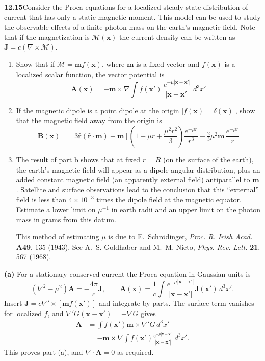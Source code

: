 \par\bigskip
\noindent\textbf{12.15}\quad Consider the Proca equations for a localized steady-state distribution of current that has only a static magnetic moment. This model can be used to study the observable effects of a finite photon mass on the earth's magnetic field. Note that if the magnetization is $\mathcal{M}(\mathbf{x})$ the current density can be written as $\mathbf{J}=c(\nabla\times\mathcal{M})$.
\begin{enumerate}
\item[(a)] Show that if $\mathcal{M}=\mathbf{m}f(\mathbf{x})$, where $\mathbf{m}$ is a fixed vector and $f(\mathbf{x})$ is a localized scalar function, the vector potential is
\[
\mathbf{A}(\mathbf{x})=-\mathbf{m}\times\nabla\int f(\mathbf{x}')\,\frac{e^{-\mu|\mathbf{x}-\mathbf{x}'|}}{|\mathbf{x}-\mathbf{x}'|}\;d^{3}x'
\]
\item[(b)] If the magnetic dipole is a point dipole at the origin [$f(\mathbf{x})=\delta(\mathbf{x})$], show that the magnetic field away from the origin is
\[
\mathbf{B}(\mathbf{x})=[3\hat{\mathbf{r}}(\hat{\mathbf{r}}\cdot\mathbf{m})-\mathbf{m}]\!\left(1+\mu r+\frac{\mu^{2}r^{2}}{3}\right)\!\frac{e^{-\mu r}}{r^{3}}-\tfrac{2}{3}\mu^{2}\mathbf{m}\,\frac{e^{-\mu r}}{r}
\]
\item[(c)] The result of part b shows that at fixed $r=R$ (on the surface of the earth), the earth's magnetic field will appear as a dipole angular distribution, plus an added constant magnetic field (an apparently external field) antiparallel to $\mathbf{m}$. Satellite and surface observations lead to the conclusion that this ``external'' field is less than $4\times10^{-3}$ times the dipole field at the magnetic equator. Estimate a lower limit on $\mu^{-1}$ in earth radii and an upper limit on the photon mass in grams from this datum.

This method of estimating $\mu$ is due to E.~Schr\"odinger, \emph{Proc. R. Irish Acad.} \textbf{A49}, 135 (1943). See A.~S. Goldhaber and M.~M. Nieto, \emph{Phys. Rev. Lett.} \textbf{21}, 567 (1968).
\end{enumerate}
\solution

\medskip\noindent\textbf{(a)} For a stationary conserved current the Proca equation in Gaussian
units is
\[
(\nabla^2-\mu^2)\mathbf A=-\frac{4\pi}{c}\mathbf J,\qquad
\mathbf A(\mathbf x)=\frac1c\int
 \frac{e^{-\mu|\mathbf x-\mathbf x'|}}{|\mathbf x-\mathbf x'|}
 \mathbf J(\mathbf x')\,d^3x'.
\]
Insert $\mathbf J=c\nabla'\times[\mathbf m f(\mathbf x')]$
and integrate by parts.  The surface term vanishes for localized
$f$, and $\nabla'G(\mathbf x-\mathbf x')=-\nabla G$ gives
\begin{align*}
\mathbf A
 &=\int f(\mathbf x')\mathbf m\times\nabla'G\,d^3x'\\
 &=-\mathbf m\times\nabla
 \int f(\mathbf x')\frac{e^{-\mu|\mathbf x-\mathbf x'|}}
 {|\mathbf x-\mathbf x'|}\,d^3x'.
\end{align*}
This proves part (a), and $\nabla\cdot\mathbf A=0$ as required.

